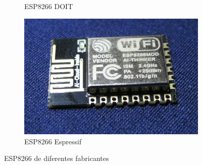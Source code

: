 \documentclass{beamer}
\begin{document}
\begin{frame}
\begin{minipage}{\textwidth}
\begin{figure}
\begin{subfigure}[b]{0.25\textwidth}
			\caption{ESP8266 DOIT}
			\label{fig:ndgdfode_mcudfd}
		\end{subfigure}
		\begin{subfigure}[b]{0.25\textwidth}
			\includegraphics[width=\textwidth]{ESP8266Espressif.JPG}
			\caption{ESP8266 Espressif}
			\label{fig:nofdffgfgdde_mfdfdcudfd}
		\end{subfigure}
		\caption{ESP8266 de diferentes fabricantes}
		\label{fig:phghglfdacddsfa_iot}
	\end{figure}

\end{minipage}
\end{frame} 
\end{document}
